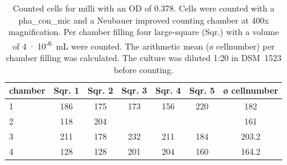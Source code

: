 \begin{table}[ht]
\centering
\caption[Counted cells for \acrlong{milli} with an \acrshort{OD} of 0.378.]{Counted cells for \acrlong{milli} with an \acrshort{OD} of 0.378. Cells were counted with a \gls{pha_con_mic} and a Neubauer improved counting chamber at 400x magnification. Per chamber filling four large-square (Sqr.) with a volume of 4~$\cdot$~10\textsuperscript{-6}~mL were counted. The arithmetic mean (ø cellnumber) per chamber filling was calculated. The culture was diluted 1:20 in DSM~1523 before counting.} 
\label{tab:cellnmr_milli}
\begin{tabular}{lcccccc}
  \toprule
chamber & Sqr. 1 & Sqr. 2 & Sqr. 3 & Sqr. 4 & Sqr. 5 & ø cellnumber \\ 
  \midrule
1 & 186 & 175 & 173 & 156 & 220 & 182 \\ 
  2 & 118 & 204 &  &  &  & 161 \\ 
  3 & 211 & 178 & 232 & 211 & 184 & 203.2 \\ 
  4 & 128 & 128 & 201 & 204 & 160 & 164.2 \\ 
   \bottomrule
\end{tabular}
\end{table}
